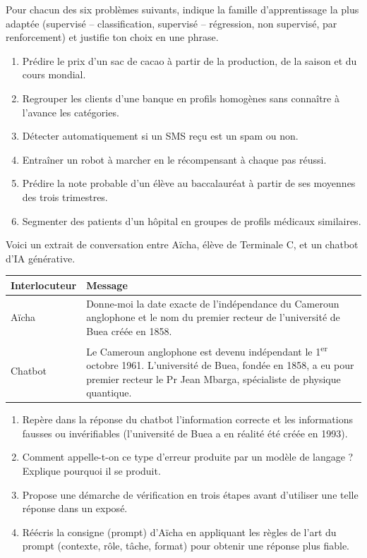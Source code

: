 \documentclass[11pt]{article}
\newcounter{popsec}
\newcounter{popsub}
\newcommand{\courssub}[1]{%
  \stepcounter{popsub}%
  \par\vspace{9pt}\noindent{\popxbold\fontsize{11.5}{13}\selectfont\color{popink}{\color{poporange}\thepopsec.\thepopsub}\hspace{6pt}#1}\par\nopagebreak\vspace{4pt}
}
\begin{document}
\courssub{Je m'entraîne}

\begin{exercice}
Pour chacun des six problèmes suivants, indique la famille d'apprentissage la plus adaptée (supervisé -- classification, supervisé -- régression, non supervisé, par renforcement) et justifie ton choix en une phrase.
\begin{enumerate}
\item Prédire le prix d'un sac de cacao à partir de la production, de la saison et du cours mondial.
\item Regrouper les clients d'une banque en profils homogènes sans connaître à l'avance les catégories.
\item Détecter automatiquement si un SMS reçu est un spam ou non.
\item Entraîner un robot à marcher en le récompensant à chaque pas réussi.
\item Prédire la note probable d'un élève au baccalauréat à partir de ses moyennes des trois trimestres.
\item Segmenter des patients d'un hôpital en groupes de profils médicaux similaires.
\end{enumerate}
\end{exercice}

\begin{exercice}
Voici un extrait de conversation entre Aïcha, élève de Terminale C, et un chatbot d'IA générative.

\begin{center}
\begin{tabularx}{\linewidth}{|l|X|}
\hline
\rowcolor{popblueL} \textbf{Interlocuteur} & \textbf{Message} \\
\hline
Aïcha & Donne-moi la date exacte de l'indépendance du Cameroun anglophone et le nom du premier recteur de l'université de Buea créée en 1858. \\
\hline
Chatbot & Le Cameroun anglophone est devenu indépendant le 1\textsuperscript{er} octobre 1961. L'université de Buea, fondée en 1858, a eu pour premier recteur le Pr Jean Mbarga, spécialiste de physique quantique. \\
\hline
\end{tabularx}
\end{center}

\begin{enumerate}
\item Repère dans la réponse du chatbot l'information correcte et les informations fausses ou invérifiables (l'université de Buea a en réalité été créée en 1993).
\item Comment appelle-t-on ce type d'erreur produite par un modèle de langage ? Explique pourquoi il se produit.
\item Propose une démarche de vérification en trois étapes avant d'utiliser une telle réponse dans un exposé.
\item Réécris la consigne (prompt) d'Aïcha en appliquant les règles de l'art du prompt (contexte, rôle, tâche, format) pour obtenir une réponse plus fiable.
\end{enumerate}
\end{exercice}
\end{document}
